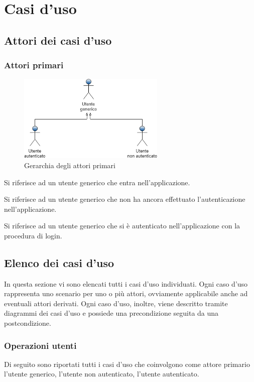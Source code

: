 \section{Casi d'uso} 
\subsection{Attori dei casi d'uso}
\subsubsection{Attori primari}
\begin{figure}[h]
	\includegraphics[width=7cm]{res/images/attori_primari.png}
	\centering
	\caption{Gerarchia degli attori primari}
\end{figure}
\begin{description}[style=nextline]
	\item[Utente generico]
	Si riferisce ad un utente generico che entra nell'applicazione.
	\item[Utente non autenticato]
	Si riferisce ad un utente generico che non ha ancora effettuato l'autenticazione nell'applicazione.
	\item[Utente autenticato]
	Si riferisce ad un utente generico che si è autenticato nell'applicazione con la procedura di login.
\end{description}

\subsection{Elenco dei casi d'uso}
In questa sezione vi sono elencati tutti i casi d'uso individuati. Ogni caso d'uso rappresenta uno scenario per uno o più attori, ovviamente applicabile anche ad eventuali attori derivati. Ogni caso d'uso, inoltre, viene descritto tramite diagrammi dei casi d'uso e possiede una precondizione seguita da una postcondizione.
\subsubsection*{Operazioni utenti}
Di seguito sono riportati tutti i casi d'uso che coinvolgono come attore primario l'utente generico, l'utente non autenticato, l'utente autenticato.
\newpage







\pagebreak
